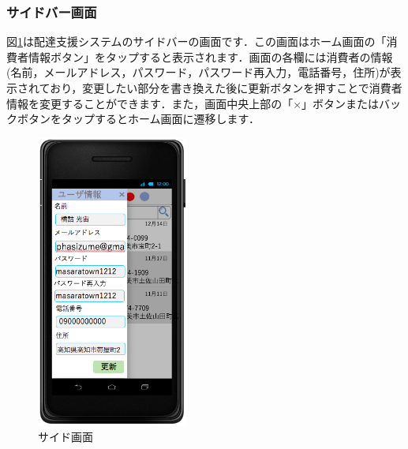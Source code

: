 \documentclass[a4j,titlepage]{jarticle}
\begin{document}
\subsubsection{サイドバー画面}
図\ref{fig:user_side}は配達支援システムのサイドバーの画面です．この画面はホーム画面の「消費者情報ボタン」をタップすると表示されます．画面の各欄には消費者の情報(名前，メールアドレス，パスワード，パスワード再入力，電話番号，住所)が表示されており，変更したい部分を書き換えた後に更新ボタンを押すことで消費者情報を変更することができます．また，画面中央上部の「×」ボタンまたはバックボタンをタップするとホーム画面に遷移します．

\begin{figure}[H]
 \begin{center}
  \includegraphics[width=50mm]{user_side.png}
	\caption{サイド画面}
	\label{fig:user_side}
 \end{center}

\end{figure}
\newpage
\end{document}
